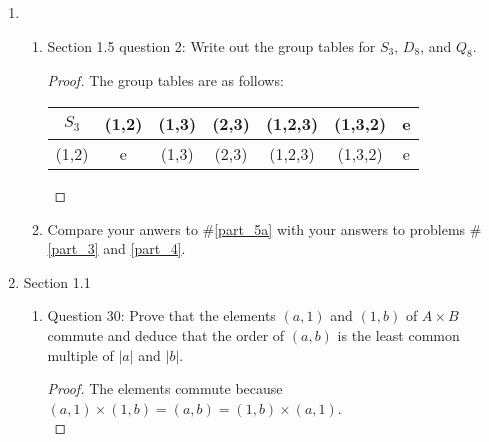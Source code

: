 \documentclass{article}
\begin{document}
\begin{enumerate}
\begin{enumerate}
\begin{proof}
\begin{center}
\begin{tabular}{|r||r|r|r|r|r|r|r|r|}
              \hline
            \end{tabular}
          \end{center}
        \end{proof}
      \item Compare your answer to part (\ref{part_a}) with your answer to
        \#\ref{part_3} above.
        \begin{proof}
          Even though groups $G$ and $H$ are non-Abelian and of order eight,
          they are not isomorphic because $G$ has only two elements of
          order two while $H$ has six.
        \end{proof}
    \end{enumerate}
  \item
    \begin{enumerate}
      \item Section 1.5 question 2: Write out the group tables for $S_3$,
        $D_8$, and $Q_8$. \label{part_5a}
        \begin{proof}
          The group tables are as follows:
          \begin{center}
            \begin{tabular}{|c||c|c|c|c|c|c|}
              \hline
              $S_3$     & (1,2)   & (1,3)   & (2,3)   & (1,2,3) & (1,3,2) & e \\
              \hline\hline
              (1,2)     & e       & (1,3)   & (2,3)   & (1,2,3) & (1,3,2) & e \\
              \hline
            \end{tabular}
          \end{center}
        \end{proof}
      \item Compare your anwers to \#\ref{part_5a} with your answers to
        problems \#\ref{part_3} and \ref{part_4}.
    \end{enumerate}
  \item Section 1.1
    \begin{enumerate}
      \item Question 30: Prove that the elements $(a,1)$ and $(1,b)$ of
        $A\times B$ commute and deduce that the order of $(a,b)$ is the
        least common multiple of $|a|$ and $|b|$.
        \begin{proof}
          The elements commute because
          $(a,1)\times(1,b)=(a,b)=(1,b)\times(a,1)$. \\


\end{proof}
\end{enumerate}
\end{enumerate}
\end{document}
